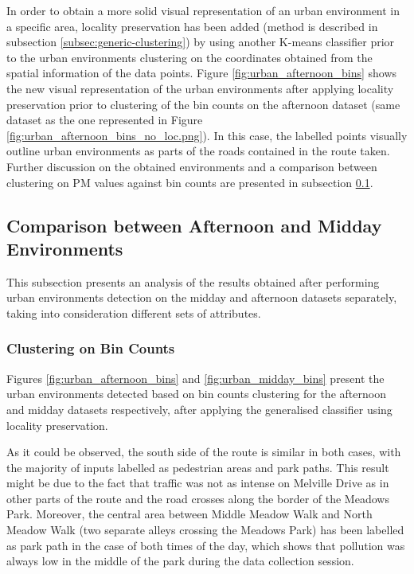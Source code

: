 \documentclass[bsc,frontabs,twoside,singlespacing,parskip,deptreport]{infthesis}     %
\begin{document}
In order to obtain a more solid visual representation of an urban environment in a specific area, locality preservation has been added (method is described in subsection \ref{subsec:generic-clustering}) by using another K-means classifier prior to the urban environments clustering on the coordinates obtained from the spatial information of the data points. Figure \ref{fig:urban_afternoon_bins} shows the new visual representation of the urban environments after applying locality preservation prior to clustering of the bin counts on the afternoon dataset (same dataset as the one represented in Figure \ref{fig:urban_afternoon_bins_no_loc.png}). In this case, the labelled points visually outline urban environments as parts of the roads contained in the route taken. Further discussion on the obtained environments and a comparison between clustering on PM values against bin counts are presented in subsection \ref{subsec:afternoon-midday-results}.


\subsection{Comparison between Afternoon and Midday Environments}
\label{subsec:afternoon-midday-results}

This subsection presents an analysis of the results obtained after performing urban environments detection on the midday and afternoon datasets separately, taking into consideration different sets of attributes.

\subsubsection*{Clustering on Bin Counts}

Figures \ref{fig:urban_afternoon_bins} and \ref{fig:urban_midday_bins} present the urban environments detected based on bin counts clustering for the afternoon and midday datasets respectively, after applying the generalised classifier using locality preservation.

As it could be observed, the south side of the route is similar in both cases, with the majority of inputs labelled as pedestrian areas and park paths. This result might be due to the fact that traffic was not as intense on Melville Drive as in other parts of the route and the road crosses along the border of the Meadows Park. Moreover, the central area between Middle Meadow Walk and North Meadow Walk (two separate alleys crossing the Meadows Park) has been labelled as park path in the case of both times of the day, which shows that pollution was always low in the middle of the park during the data collection session.
\end{document}
